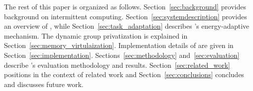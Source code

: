The rest of this paper is organized as follows. Section~\ref{sec:background} provides background on intermittent computing.
Section~\ref{sec:systemdescription} provides an overview of \sys, while
Section~\ref{sec:task_adaptation} describes \sys's energy-adaptive mechanism. The dynamic group privatization is explained in Section~\ref{sec:memory_virtulaization}. Implementation details of \sys are given in Section~\ref{sec:implementation}. Sections~\ref{sec:methodology} and~\ref{sec:evaluation} describe \sys's evaluation methodology and results. Section~\ref{sec:related_work} positions \sys in the
context of related work and Section~\ref{sec:conclusions} concludes and discusses
future work.
